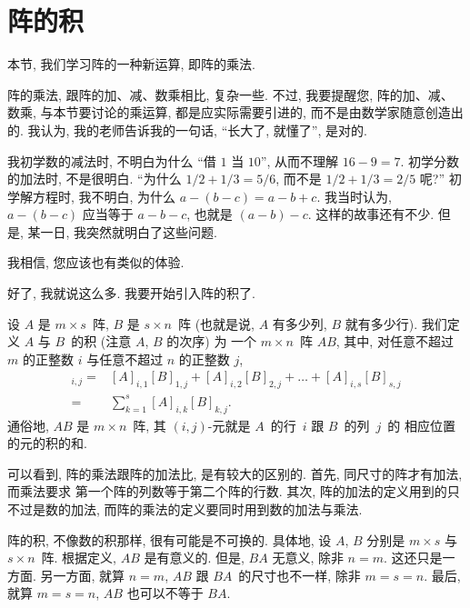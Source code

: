 \documentclass[%
    UTF8,%
    fontset=none,%
    punct=kaiming,%
    zihao=-4,%
    a4paper,%
    oneside,%
]{ctexbook}
\begin{document}
\section{阵的积}

本节, 我们学习阵的一种新运算, 即阵的乘法.

阵的乘法, 跟阵的加、减、数乘相比, 复杂一些.
不过, 我要提醒您,
阵的加、减、数乘, 与本节要讨论的乘运算,
都是应实际需要引进的,
而不是由数学家随意创造出的.
我认为, 我的老师告诉我的一句话,
``长大了, 就懂了'',
是对的.

我初学数的减法时, 不明白为什么
``借 \(1\) 当 \(10\)'',
从而不理解 \(16 - 9 = 7\).
初学分数的加法时, 不是很明白.
``为什么 \(1/2 + 1/3 = 5/6\),
而不是 \(1/2 + 1/3 = 2/5\) 呢?''
初学解方程时,
我不明白, 为什么 \(a - (b - c) = a - b + c\).
我当时认为, \(a - (b - c)\)
应当等于 \(a - b - c\),
也就是 \((a - b) - c\).
这样的故事还有不少.
但是, 某一日, 我突然就明白了这些问题.

我相信, 您应该也有类似的体验.

好了, 我就说这么多.
我要开始引入阵的积了.

\begin{definition}
    设 \(A\) 是 \(m \times s\)~阵,
    \(B\) 是 \(s \times n\)~阵
    (也就是说, \(A\) 有多少列, \(B\) 就有多少行).
    我们定义 \(A\) 与 \(B\)~的积 (注意 \(A\), \(B\) 的次序) 为%
    一个 \(m \times n\)~阵 \(AB\),
    其中, 对任意不超过 \(m\) 的正整数 \(i\)
    与任意不超过 \(n\) 的正整数 \(j\),
    \begin{align*}
        [AB]_{i,j}
        = {} &
        [A]_{i,1} [B]_{1,j}
        + [A]_{i,2} [B]_{2,j}
        + \dots
        + [A]_{i,s} [B]_{s,j}
        \\
        = {} &
        \sum_{k = 1}^{s} {[A]_{i,k} [B]_{k,j}}.
    \end{align*}
    通俗地, \(AB\) 是 \(m \times n\)~阵,
    其 \((i, j)\)-元就是
    \(A\)~的行~\(i\) 跟 \(B\)~的列~\(j\)~的%
    相应位置的元的积的和.
\end{definition}

可以看到, 阵的乘法跟阵的加法比, 是有较大的区别的.
首先, 同尺寸的阵才有加法, 而乘法要求%
第一个阵的列数等于第二个阵的行数.
其次, 阵的加法的定义用到的只不过是数的加法,
而阵的乘法的定义要同时用到数的加法与乘法.

阵的积, 不像数的积那样, 很有可能是不可换的.
具体地,
设 \(A\), \(B\) 分别是 \(m \times s\) 与 \(s \times n\)~阵.
根据定义, \(AB\) 是有意义的.
但是, \(BA\) 无意义, 除非 \(n = m\).
这还只是一方面.
另一方面, 就算 \(n = m\),
\(AB\) 跟 \(BA\)~的尺寸也不一样,
除非 \(m = s = n\).
最后, 就算 \(m = s = n\),
\(AB\) 也可以不等于 \(BA\).
\end{document}
